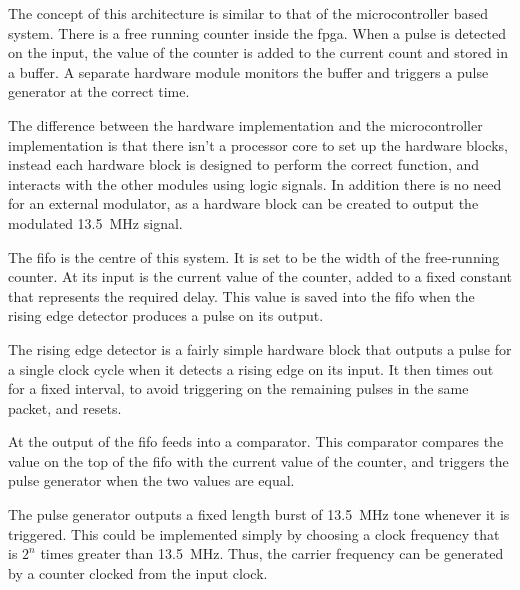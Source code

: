 The concept of this architecture is similar to that of the microcontroller based system. There is a free running counter inside the \gls{fpga}. When a pulse is detected on the input, the value of the counter is added to the current count and stored in a buffer. A separate hardware module monitors the buffer and triggers a pulse generator at the correct time.

The difference between the hardware implementation and the microcontroller implementation is that there isn't a processor core to set up the hardware blocks, instead each hardware block is designed to perform the correct function, and interacts with the other modules using logic signals. In addition there is no need for an external modulator, as a hardware block can be created to output the modulated \SI{13.5}{\mega\hertz} signal.

The \gls{fifo} is the centre of this system. It is set to be the width of the free-running counter. At its input is the current value of the counter, added to a fixed constant that represents the required delay. This value is saved into the \gls{fifo} when the rising edge detector produces a pulse on its output.

The rising edge detector is a fairly simple hardware block that outputs a pulse for a single clock cycle when it detects a rising edge on its input. It then times out for a fixed interval, to avoid triggering on the remaining pulses in the same packet, and resets.

At the output of the \gls{fifo} feeds into a comparator. This comparator compares the value on the top of the \gls{fifo} with the current value of the counter, and triggers the pulse generator when the two values are equal.

The pulse generator outputs a fixed length burst of \SI{13.5}{\mega\hertz} tone whenever it is triggered. This could be implemented simply by choosing a clock frequency that is $2^n$ times greater than \SI{13.5}{\mega\hertz}. Thus, the carrier frequency can be generated by a counter clocked from the input clock.


